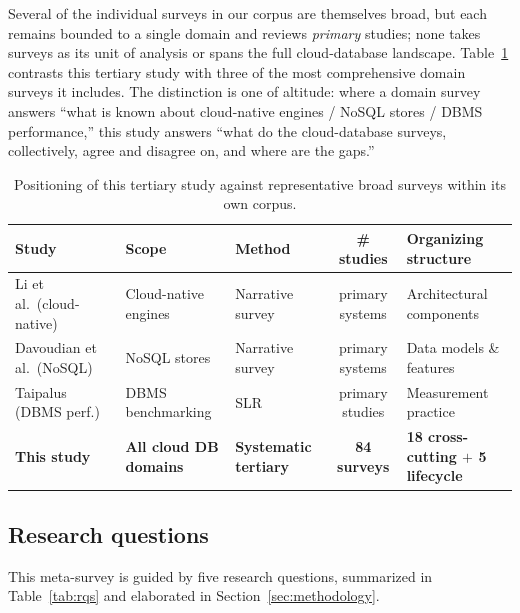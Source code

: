 \documentclass[a4paper,fleqn]{cas-sc}
\begin{document}
Several of the individual surveys in our corpus are themselves broad, but each remains bounded to a single domain and reviews \emph{primary} studies; none takes surveys as its unit of analysis or spans the full cloud-database landscape. Table~\ref{tab:positioning} contrasts this tertiary study with three of the most comprehensive domain surveys it includes. The distinction is one of altitude: where a domain survey answers ``what is known about cloud-native engines / NoSQL stores / DBMS performance,'' this study answers ``what do the cloud-database surveys, collectively, agree and disagree on, and where are the gaps.''

\begin{table}[H]
\centering
\caption{Positioning of this tertiary study against representative broad surveys within its own corpus.}
\label{tab:positioning}
\small
\begin{tabular}{p{3.5cm} p{2.4cm} p{2.2cm} c p{3.0cm}}
\toprule
\textbf{Study} & \textbf{Scope} & \textbf{Method} & \textbf{\# studies} & \textbf{Organizing structure} \\
\midrule
Li et al.\ (cloud-native)~\cite{Li2024CloudNativeSurvey} & Cloud-native engines & Narrative survey & primary systems & Architectural components \\
\addlinespace
Davoudian et al.\ (NoSQL)~\cite{Davoudian2018NoSQL} & NoSQL stores & Narrative survey & primary systems & Data models \& features \\
\addlinespace
Taipalus (DBMS perf.)~\cite{Taipalus2024DBMSPerf} & DBMS benchmarking & SLR & primary studies & Measurement practice \\
\addlinespace
\textbf{This study} & \textbf{All cloud DB domains} & \textbf{Systematic tertiary} & \textbf{84 surveys} & \textbf{18 cross-cutting $+$ 5 lifecycle} \\
\bottomrule
\end{tabular}
\end{table}

\subsection{Research questions}
\label{subsec:rqs}

This meta-survey is guided by five research questions, summarized in Table~\ref{tab:rqs} and elaborated in Section~\ref{sec:methodology}.
\end{document}

